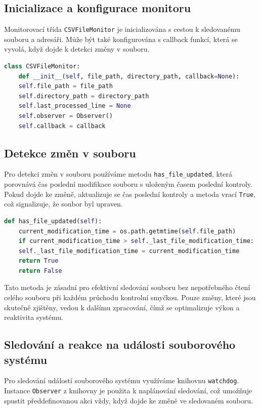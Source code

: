 \documentclass[12pt, a4paper,
twoside,        %
openright
]{report}
\begin{document}
\subsection{Inicializace a konfigurace monitoru}
Monitorovací třída \texttt{CSVFileMonitor} je inicializována s cestou k sledovanému souboru a adresáři. Může být také konfigurována s callback funkcí, která se vyvolá, když dojde k detekci změny v souboru.

\begin{lstlisting}[language=Python, caption={Inicializace monitoru souboru}]
	class CSVFileMonitor:
	def __init__(self, file_path, directory_path, callback=None):
	self.file_path = file_path
	self.directory_path = directory_path
	self.last_processed_line = None
	self.observer = Observer()
	self.callback = callback
\end{lstlisting}

\subsection{Detekce změn v souboru}
Pro detekci změn v souboru používáme metodu \texttt{has\_file\_updated}, která porovnává čas poslední modifikace souboru s uloženým časem poslední kontroly. Pokud dojde ke změně, aktualizuje se čas poslední kontroly a metoda vrací \texttt{True}, což signalizuje, že soubor byl upraven.

\begin{lstlisting}[language=Python, caption={Detekce změn v CSV souboru}]
	def has_file_updated(self):
	current_modification_time = os.path.getmtime(self.file_path)
	if current_modification_time > self._last_file_modification_time:
	self._last_file_modification_time = current_modification_time
	return True
	return False
\end{lstlisting}

Tato metoda je zásadní pro efektivní sledování souboru bez nepotřebného čtení celého souboru při každém průchodu kontrolní smyčkou. Pouze změny, které jsou skutečně zjištěny, vedou k dalšímu zpracování, čímž se optimalizuje výkon a reaktivita systému.


\subsection{Sledování a reakce na události souborového systému}
Pro sledování událostí souborového systému využíváme knihovnu \texttt{watchdog}. Instance \texttt{Observer} z knihovny je použita k naplánování sledování, což umožňuje spustit předdefinovanou akci vždy, když dojde ke změně ve sledovaném souboru.
\end{document}

